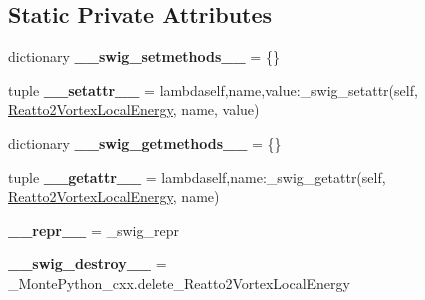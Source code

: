 \subsection*{Static Private Attributes}
\begin{DoxyCompactItemize}
\item 
\hypertarget{classMontePython__cxx_1_1Reatto2VortexLocalEnergy_a8c1753ae06aad704adb649413a037941}{}dictionary {\bfseries \+\_\+\+\_\+swig\+\_\+setmethods\+\_\+\+\_\+} = \{\}\label{classMontePython__cxx_1_1Reatto2VortexLocalEnergy_a8c1753ae06aad704adb649413a037941}

\item 
\hypertarget{classMontePython__cxx_1_1Reatto2VortexLocalEnergy_ad998d4afe1cc459dec0bcabef96caf0c}{}tuple {\bfseries \+\_\+\+\_\+setattr\+\_\+\+\_\+} = lambdaself,name,value\+:\+\_\+swig\+\_\+setattr(self, \hyperlink{classMontePython__cxx_1_1Reatto2VortexLocalEnergy}{Reatto2\+Vortex\+Local\+Energy}, name, value)\label{classMontePython__cxx_1_1Reatto2VortexLocalEnergy_ad998d4afe1cc459dec0bcabef96caf0c}

\item 
\hypertarget{classMontePython__cxx_1_1Reatto2VortexLocalEnergy_aa134b238408482b5244897a6955cf469}{}dictionary {\bfseries \+\_\+\+\_\+swig\+\_\+getmethods\+\_\+\+\_\+} = \{\}\label{classMontePython__cxx_1_1Reatto2VortexLocalEnergy_aa134b238408482b5244897a6955cf469}

\item 
\hypertarget{classMontePython__cxx_1_1Reatto2VortexLocalEnergy_a463ad6c41b0e8c2c6ab526fc14e465ab}{}tuple {\bfseries \+\_\+\+\_\+getattr\+\_\+\+\_\+} = lambdaself,name\+:\+\_\+swig\+\_\+getattr(self, \hyperlink{classMontePython__cxx_1_1Reatto2VortexLocalEnergy}{Reatto2\+Vortex\+Local\+Energy}, name)\label{classMontePython__cxx_1_1Reatto2VortexLocalEnergy_a463ad6c41b0e8c2c6ab526fc14e465ab}

\item 
\hypertarget{classMontePython__cxx_1_1Reatto2VortexLocalEnergy_a6bf22463ff2942057b42006199c2311b}{}{\bfseries \+\_\+\+\_\+repr\+\_\+\+\_\+} = \+\_\+swig\+\_\+repr\label{classMontePython__cxx_1_1Reatto2VortexLocalEnergy_a6bf22463ff2942057b42006199c2311b}

\item 
\hypertarget{classMontePython__cxx_1_1Reatto2VortexLocalEnergy_ac9457ce253dc75ce757e02a0d05d5fd0}{}{\bfseries \+\_\+\+\_\+swig\+\_\+destroy\+\_\+\+\_\+} = \+\_\+\+Monte\+Python\+\_\+cxx.\+delete\+\_\+\+Reatto2\+Vortex\+Local\+Energy\label{classMontePython__cxx_1_1Reatto2VortexLocalEnergy_ac9457ce253dc75ce757e02a0d05d5fd0}

\end{DoxyCompactItemize}


